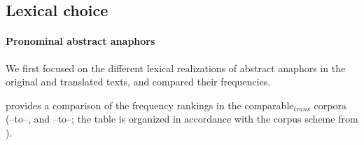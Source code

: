 \documentclass[output=paper]{LSP/langsci}
\begin{document}





\subsection{Lexical choice}
\label{sec:choice}


\paragraph*{Pronominal abstract anaphors}

We first focused on the different lexical realizations of abstract anaphors in the original and  translated texts, and compared their frequencies. 

 provides a comparison of the frequency rankings in the compara\-ble$_{trans}$ corpora (\DEo--to--\DEt, and \ENo--to--\ENt; the table is organized in accordance with the corpus scheme from ). 
 
\end{document}
